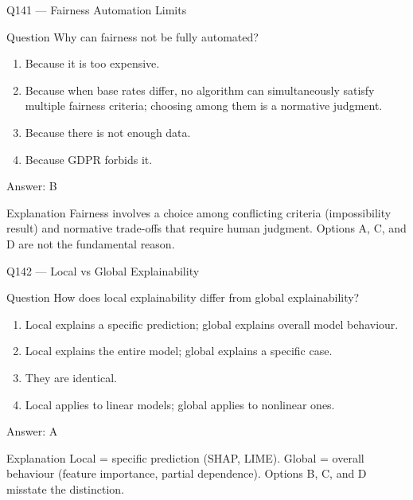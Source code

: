 \documentclass[aspectratio=169,8pt]{beamer}
\begin{document}
\begin{frame}{Q141 --- Fairness Automation Limits}
\begin{block}{Question}
Why can fairness not be fully automated?
\begin{enumerate}
\item Because it is too expensive.
\item Because when base rates differ, no algorithm can simultaneously satisfy multiple fairness criteria; choosing among them is a normative judgment.
\item Because there is not enough data.
\item Because GDPR forbids it.
\end{enumerate} 	\end{block}
\begin{exampleblock}{Answer: B}\end{exampleblock}
\begin{block}{Explanation}
Fairness involves a choice among conflicting criteria (impossibility result) and normative trade-offs that require human judgment. Options A, C, and D are not the fundamental reason.
\end{block}
\end{frame}

\begin{frame}{Q142 --- Local vs Global Explainability}
\begin{block}{Question}
How does local explainability differ from global explainability?
\begin{enumerate}
\item Local explains a specific prediction; global explains overall model behaviour.
\item Local explains the entire model; global explains a specific case.
\item They are identical.
\item Local applies to linear models; global applies to nonlinear ones.
\end{enumerate} 	\end{block}
\begin{exampleblock}{Answer: A}\end{exampleblock}
\begin{block}{Explanation}
Local = specific prediction (SHAP, LIME). Global = overall behaviour (feature importance, partial dependence). Options B, C, and D misstate the distinction.
\end{block}
\end{frame}
\end{document}
